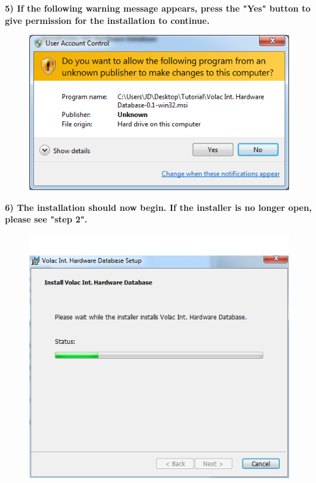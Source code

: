 \newpage

\textbf{5) If the following warning message appears, press the "Yes" button to give permission for the installation to continue.}

\begin{figure}[H]
    \includegraphics[width=\textwidth]{./Manual/Images/Tut4.png}
\end{figure}

\newpage

\textbf{6) The installation should now begin. If the installer is no longer open, please see "step 2".}

\begin{figure}[H]
    \includegraphics[width=\textwidth]{./Manual/Images/Tut5.png}
\end{figure}

